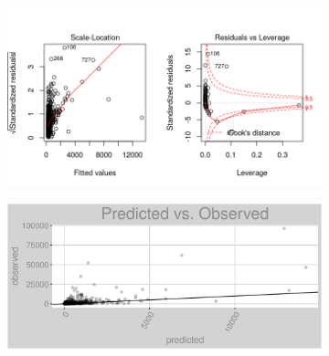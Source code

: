 \begin{figure}[h]
\centering
\begin{subfigure}{1\textwidth}
\centering
\includegraphics[width=.99\textwidth, height=0.475\textheight]{Images/fuel_oil_pls_res_2.png}
\end{subfigure}
\begin{subfigure}{1\textwidth}
\centering
\includegraphics[width=.99\textwidth, height=0.3\textheight]{Images/fuel_oil_pls_pvo.png}
\end{subfigure}
\end{figure}
\FloatBarrier
\newpage
